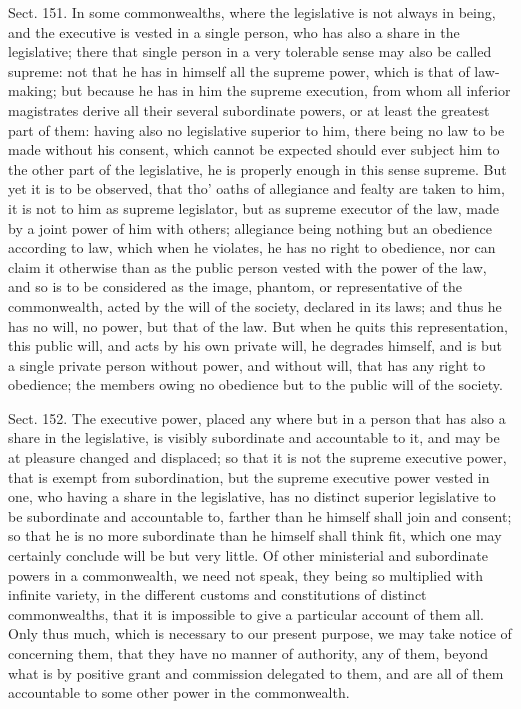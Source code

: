 \documentclass[11pt,openany]{book}
\begin{document}
Sect. 151. In some commonwealths, where the legislative is not always in being, and the executive is vested in a single person, who has also a share in the legislative; there that single person in a very tolerable sense may also be called supreme: not that he has in himself all the supreme power, which is that of law-making; but because he has in him the supreme execution, from whom all inferior magistrates derive all their several subordinate powers, or at least the greatest part of them: having also no legislative superior to him, there being no law to be made without his consent, which cannot be expected should ever subject him to the other part of the legislative, he is properly enough in this sense supreme. But yet it is to be observed, that tho' oaths of allegiance and fealty are taken to him, it is not to him as supreme legislator, but as supreme executor of the law, made by a joint power of him with others; allegiance being nothing but an obedience according to law, which when he violates, he has no right to obedience, nor can claim it otherwise than as the public person vested with the power of the law, and so is to be considered as the image, phantom, or representative of the commonwealth, acted by the will of the society, declared in its laws; and thus he has no will, no power, but that of the law. But when he quits this representation, this public will, and acts by his own private will, he degrades himself, and is but a single private person without power, and without will, that has any right to obedience; the members owing no obedience but to the public will of the society.

Sect. 152. The executive power, placed any where but in a person that has also a share in the legislative, is visibly subordinate and accountable to it, and may be at pleasure changed and displaced; so that it is not the supreme executive power, that is exempt from subordination, but the supreme executive power vested in one, who having a share in the legislative, has no distinct superior legislative to be subordinate and accountable to, farther than he himself shall join and consent; so that he is no more subordinate than he himself shall think fit, which one may certainly conclude will be but very little. Of other ministerial and subordinate powers in a commonwealth, we need not speak, they being so multiplied with infinite variety, in the different customs and constitutions of distinct commonwealths, that it is impossible to give a particular account of them all. Only thus much, which is necessary to our present purpose, we may take notice of concerning them, that they have no manner of authority, any of them, beyond what is by positive grant and commission delegated to them, and are all of them accountable to some other power in the commonwealth.
\end{document}
